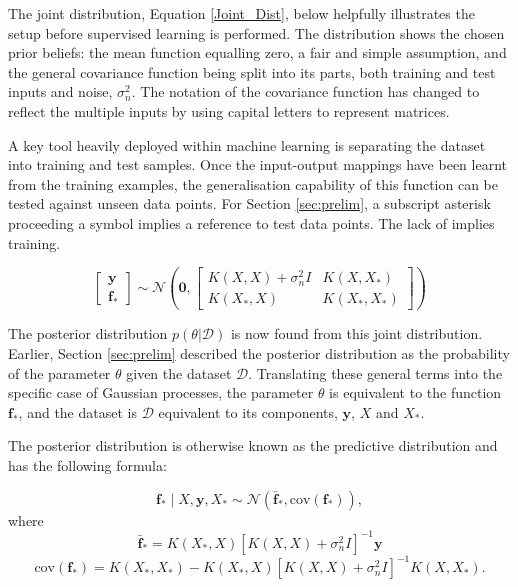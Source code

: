 \documentclass[12pt,a4paper]{article}
\begin{document}
The joint distribution, Equation \eqref{Joint_Dist}, below helpfully illustrates the setup before supervised learning is performed. The distribution shows the chosen prior beliefs: the mean function equalling zero, a fair and simple assumption, and the general covariance function being split into its parts, both training and test inputs and noise, \(\sigma_n^2\). The notation of the covariance function has changed to reflect the multiple inputs by using capital letters to represent matrices.

A key tool heavily deployed within machine learning is separating the dataset into training and test samples. Once the input-output mappings have been learnt from the training examples, the generalisation capability of this function can be tested against unseen data points. For Section \ref{sec:prelim}, a subscript asterisk proceeding a symbol implies a reference to test data points. The lack of implies training.

\begin{equation}
\begin{bmatrix}
\mathbf{y} \\
\mathbf{f}_*
\end{bmatrix}
\sim \mathcal{N}\left(
\mathbf{0},
\begin{bmatrix}
K(X, X) + \sigma_n^2 I & K(X, X_*) \\
K(X_*, X) & K(X_*, X_*)
\end{bmatrix}
\right)
\label{Joint_Dist}
\end{equation}

The posterior distribution \(p(\theta|\mathcal{D})\) is now found from this joint distribution. Earlier, Section \ref{sec:prelim} described the posterior distribution as the probability of the parameter \(\theta\) given the dataset \(\mathcal{D}\). Translating these general terms into the specific case of Gaussian processes, the parameter \(\theta\) is equivalent to the function \(\mathbf{f}_*\), and the dataset is \(\mathcal{D}\) equivalent to its components, \(\mathbf{y}\), \(X\) and \(X_*\).

The posterior distribution is otherwise known as the predictive distribution and has the following formula:

\begin{equation*}
\mathbf{f}_* \mid X, \mathbf{y}, X_* \sim \mathcal{N}(\bar{\mathbf{f}}_*, \text{cov}(\mathbf{f}_*)),
\end{equation*}
where
\begin{equation}
\bar{\mathbf{f}}_* = K(X_*, X)[K(X, X) + \sigma_n^2 I]^{-1} \mathbf{y}
\label{predictive mean}
\end{equation}
\begin{equation}
\text{cov}(\mathbf{f}_*) = K(X_*, X_*) - K(X_*, X)[K(X, X) + \sigma_n^2 I]^{-1} K(X, X_*).
\label{predictive covariance}
\end{equation}
\end{document}
